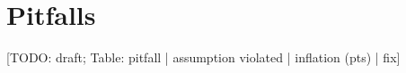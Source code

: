 \documentclass[10pt,twocolumn,letterpaper]{article}
\newcommand{\todo}[1]{{\color{red}[TODO: #1]}}
\begin{document}
\section{Pitfalls}
\label{sec:pitfalls}
\todo{draft; Table: pitfall | assumption violated | inflation (pts) | fix}

\end{document}
